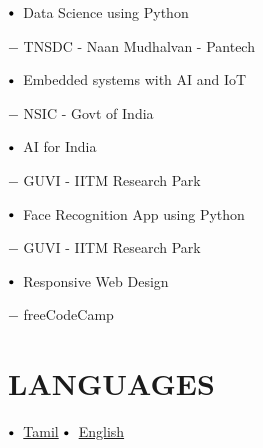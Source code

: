 \documentclass[letterpaper,11pt]{article}
\newcommand\sbullet[1][.5]{\mathbin{\vcenter{\hbox{\scalebox{#1}{$\bullet$}}}}}
\begin{document}
$\sbullet[.75] \hspace{0.1cm}$ {Data Science using Python }{\href{https://www.pantechelearning.com/MAY23/PEL_NM_PARTDSA_663.pdf} {\raisebox{-0.1\height}\faExternalLink } $-$ \large{{TNSDC - Naan Mudhalvan - Pantech}} \hspace{1.7cm}\\
 \vspace{2pt}

$\sbullet[.75] \hspace{0.1cm}$ {Embedded systems with AI and IoT }{\href{https://drive.google.com/file/d/1vHHzB53UABYKYKE0eHIcSdxRWTuKqPvg/view?usp=drive_link} {\raisebox{-0.1\height}\faExternalLink } $-$ \large{{NSIC - Govt of India}} \hspace{1.7cm}\\
 \vspace{2pt}

$\sbullet[.75] \hspace{0.1cm}$ {AI for India  }{\href{https://www.guvi.in/verify-certificate?id=941y56i91j065hI47A} {\raisebox{-0.1\height}\faExternalLink } $-$ \large{{GUVI - IITM Research Park}} \hspace{1.7cm}\\
 \vspace{2pt}

$\sbullet[.75] \hspace{0.1cm}$ {Face Recognition App using Python }{\href{https://www.guvi.in/verify-certificateid=u8933f16214cK5tTqs#} {\raisebox{-0.1\height}\faExternalLink } $-$ \large{{GUVI - IITM Research Park}} \hspace{1.7cm}\\
 \vspace{2pt}

$\sbullet[.75] \hspace{0.1cm}$ {Responsive Web Design }{\href{https://freecodecamp.org/certification/fcc9b4c3c65-392b-4ac7-a770-b8a2c376b85c/responsive-web-design} {\raisebox{-0.1\height}\faExternalLink } $-$ \large{{freeCodeCamp}} \hspace{1.7cm}\\




\section{LANGUAGES}

$\sbullet[.75] \hspace{0.1cm}$ {\href{certificateLink.com}{Tamil}} \hspace{4.45cm}
$\sbullet[.75] \hspace{0.1cm}$ {\href{certificateLink.com}{English}} \hspace{5.6cm}

}}}}}
\end{document}
